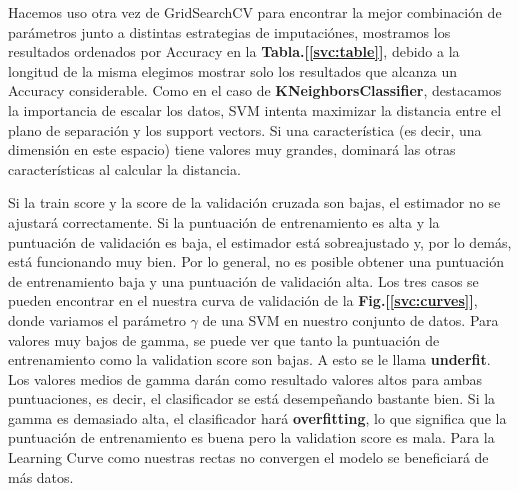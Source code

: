 \documentclass[12pt,twoside]{report}
\begin{document}
Hacemos uso otra vez de GridSearchCV para encontrar la mejor combinación de parámetros junto a distintas estrategias de imputaciónes, mostramos los resultados ordenados por Accuracy en la \textbf{Tabla.[\ref{svc:table}]}, debido a la longitud de la misma elegimos mostrar solo los resultados que alcanza un Accuracy considerable. Como en el caso de \textbf{KNeighborsClassifier}, destacamos la importancia de escalar los datos, SVM intenta maximizar la distancia entre el plano de separación y los support vectors. Si una característica (es decir, una dimensión en este espacio) tiene valores muy grandes, dominará las otras características al calcular la distancia.

Si la train score y la score de la validación cruzada son bajas, el estimador no se ajustará correctamente. Si la puntuación de entrenamiento es alta y la puntuación de validación es baja, el estimador está sobreajustado y, por lo demás, está funcionando muy bien. Por lo general, no es posible obtener una puntuación de entrenamiento baja y una puntuación de validación alta. Los tres casos se pueden encontrar en el nuestra curva de validación de la \textbf{Fig.[\ref{svc:curves}]}, donde variamos el parámetro $\gamma$ de una SVM en nuestro conjunto de datos. Para valores muy bajos de gamma, se puede ver que tanto la puntuación de entrenamiento como la validation score son bajas. A esto se le llama \textbf{underfit}. Los valores medios de gamma darán como resultado valores altos para ambas puntuaciones, es decir, el clasificador se está desempeñando bastante bien. Si la gamma es demasiado alta, el clasificador hará \textbf{overfitting}, lo que significa que la puntuación de entrenamiento es buena pero la validation score es mala. Para la Learning Curve como nuestras rectas no convergen el modelo se beneficiará de más datos.
\end{document}
